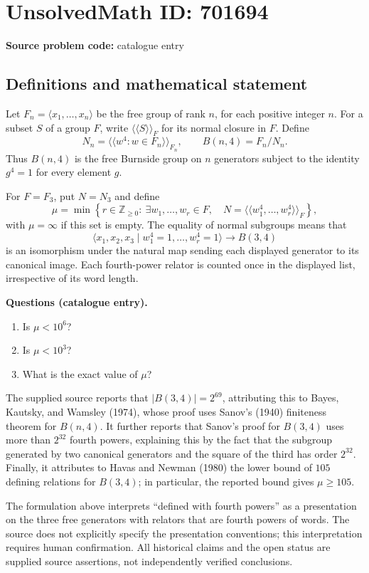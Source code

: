 \documentclass[11pt]{article}
\newcommand{\Z}{\mathbb{Z}}
\begin{document}
\section*{UnsolvedMath ID: 701694}
\textbf{Source problem code:} catalogue entry
\subsection{Definitions and mathematical statement}
Let \(F_n=\langle x_1,\ldots,x_n\rangle\) be the free group of rank \(n\), for each positive integer \(n\). For a subset \(S\) of a group \(F\), write \(\langle\!\langle S\rangle\!\rangle_F\) for its normal closure in \(F\). Define
\[
N_n=\langle\!\langle w^4:w\in F_n\rangle\!\rangle_{F_n},
\qquad B(n,4)=F_n/N_n.
\]
Thus \(B(n,4)\) is the free Burnside group on \(n\) generators subject to the identity \(g^4=1\) for every element \(g\).

For \(F=F_3\), put \(N=N_3\) and define
\[
\mu=\min\left\{r\in\Z_{\geq0}:\ \exists w_1,\ldots,w_r\in F,\quad
N=\langle\!\langle w_1^4,\ldots,w_r^4\rangle\!\rangle_F\right\},
\]
with \(\mu=\infty\) if this set is empty. The equality of normal subgroups means that
\[
\langle x_1,x_2,x_3\mid w_1^4=1,\ldots,w_r^4=1\rangle
\longrightarrow B(3,4)
\]
is an isomorphism under the natural map sending each displayed generator to its canonical image. Each fourth-power relator is counted once in the displayed list, irrespective of its word length.

\textbf{Questions (catalogue entry).}
\begin{enumerate}
\item[(a)] Is \(\mu<10^6\)?
\item[(b)] Is \(\mu<10^3\)?
\item[(c)] What is the exact value of \(\mu\)?
\end{enumerate}

The supplied source reports that \(|B(3,4)|=2^{69}\), attributing this to Bayes, Kautsky, and Wamsley (1974), whose proof uses Sanov's (1940) finiteness theorem for \(B(n,4)\). It further reports that Sanov's proof for \(B(3,4)\) uses more than \(2^{32}\) fourth powers, explaining this by the fact that the subgroup generated by two canonical generators and the square of the third has order \(2^{32}\). Finally, it attributes to Havas and Newman (1980) the lower bound of \(105\) defining relations for \(B(3,4)\); in particular, the reported bound gives \(\mu\geq105\).

The formulation above interprets ``defined with fourth powers'' as a presentation on the three free generators with relators that are fourth powers of words. The source does not explicitly specify the presentation conventions; this interpretation requires human confirmation. All historical claims and the open status are supplied source assertions, not independently verified conclusions.
\end{document}
